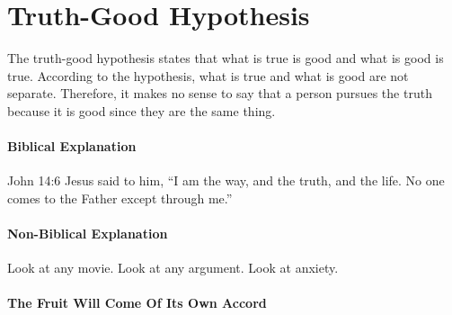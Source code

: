 \documentclass[a4paper, 12pt]{article}
\begin{document}
\section*{Truth-Good Hypothesis}
The truth-good hypothesis states that what is true is good and what is good is true. According to the hypothesis, what is true and what is good are not separate. Therefore, it makes no sense to say that a person pursues the truth because it is good since they are the same thing.
\paragraph{Biblical Explanation}
John 14:6 Jesus said to him, ``I am the way, and the truth, and the life. No one comes to the Father except through me.''
\paragraph{Non-Biblical Explanation}
Look at any movie. Look at any argument. Look at anxiety.

\paragraph{The Fruit Will Come Of Its Own Accord}
\end{document}
